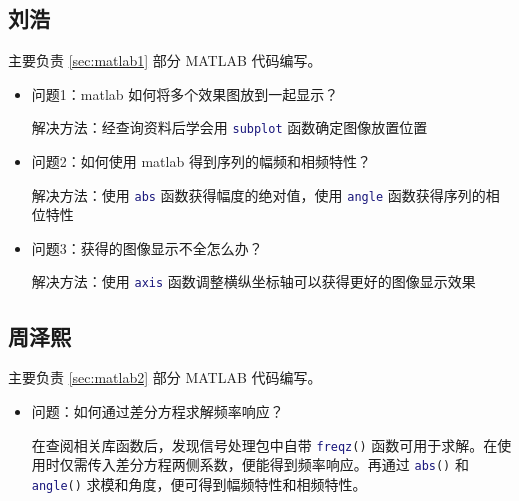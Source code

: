 \documentclass[12pt,AutoFakeBold]{article}
\begin{document}
\subsection{刘浩}

主要负责 \ref{sec:matlab1} 部分 MATLAB 代码编写。

\begin{itemize}
\item 问题1：matlab 如何将多个效果图放到一起显示？

解决方法：经查询资料后学会用 \lstinline[language=Matlab]|subplot| 函数确定图像放置位置
\item 问题2：如何使用 matlab 得到序列的幅频和相频特性？

解决方法：使用 \lstinline[language=Matlab]|abs| 函数获得幅度的绝对值，使用 \lstinline[language=Matlab]|angle| 函数获得序列的相位特性
\item 问题3：获得的图像显示不全怎么办？

解决方法：使用 \lstinline[language=Matlab]|axis| 函数调整横纵坐标轴可以获得更好的图像显示效果
\end{itemize}

\subsection{周泽熙}

主要负责 \ref{sec:matlab2} 部分 MATLAB 代码编写。

\begin{itemize}
\item 问题：如何通过差分方程求解频率响应？

在查阅相关库函数后，发现信号处理包中自带 \lstinline[language=Matlab]|freqz()| 函数可用于求解。在使用时仅需传入差分方程两侧系数，便能得到频率响应。再通过 \lstinline[language=Matlab]|abs()| 和 \lstinline[language=Matlab]|angle()| 求模和角度，便可得到幅频特性和相频特性。
\end{itemize}



\end{document}
